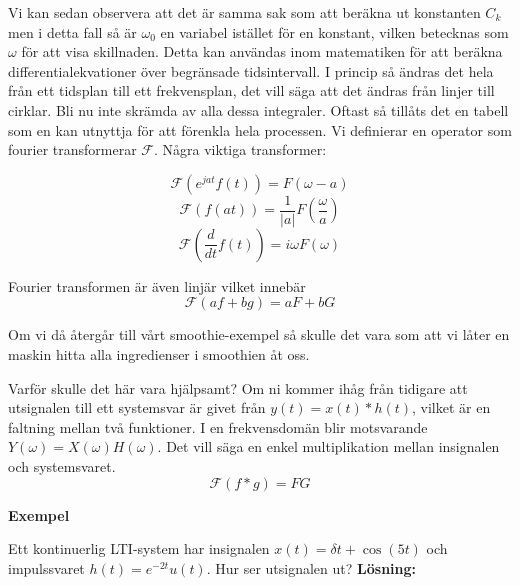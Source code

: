 \documentclass{article}
\begin{document}
Vi kan sedan observera att det är samma sak som att beräkna ut konstanten $C_k$ men i detta fall så är $\omega_0$ en variabel istället för en konstant, vilken betecknas som $\omega$ för att visa skillnaden.
Detta kan användas inom matematiken för att beräkna differentialekvationer över begränsade tidsintervall. I princip så ändras det hela från ett tidsplan till ett frekvensplan, det vill säga att det ändras från linjer till cirklar. %
Bli nu inte skrämda av alla dessa integraler. Oftast så tillåts det en tabell som en kan utnyttja för att förenkla hela processen. Vi definierar en operator som fourier transformerar $\mathcal{F}$. Några viktiga transformer:

$$\mathcal{F}(e^{j a t} f(t)) = F(\omega - a)$$%
$$\mathcal{F}(f(at)) = \frac{1}{|a|}F(\frac{\omega}{a})$$%
$$\mathcal{F}(\frac{d}{dt} f(t)) = i\omega F(\omega) $$%

Fourier transformen är även linjär vilket innebär
$$\mathcal{F}(a f + b g) = a F + b G$$

Om vi då återgår till vårt smoothie-exempel så skulle det vara som att vi låter en maskin hitta alla ingredienser i smoothien åt oss.

Varför skulle det här vara hjälpsamt? Om ni kommer ihåg från tidigare att utsignalen till ett systemsvar är givet från $y(t) = x(t) * h(t)$, vilket är en faltning mellan två funktioner. I en frekvensdomän blir motsvarande $Y(\omega) = X(\omega) H(\omega)$. Det vill säga en enkel multiplikation mellan insignalen och systemsvaret.
$$\mathcal{F}(f*g) = F G $$

\textbf{Exempel} %

Ett kontinuerlig LTI-system har insignalen $x(t)=\delta{t} + \cos(5 t)$ och impulssvaret $h(t) = e^{-2 t} u(t)$. Hur ser utsignalen ut?
\textbf{Lösning:}
\end{document}
